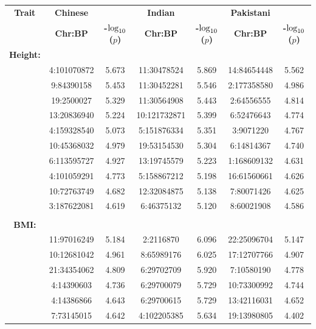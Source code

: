 \documentclass[12pt,a4paper]{article}
\def\log{{\rm log}}
\begin{document}
\clearpage
\setlength{\footskip}{1cm}
\addtocounter{table}{-1}

\begin{landscape}
\setlength{\footskip}{2cm}
\begin{table}[ht]
\centering
\begin{tabular}{ccccccc}
  \hline
  \textbf{Trait} & \textbf{Chinese} & & \textbf{Indian} & & \textbf{Pakistani} & \\ 
& \textbf{Chr:BP} & \textbf{-$\log_{10}$($p$)} & \textbf{Chr:BP} & \textbf{-$\log_{10}$($p$)} & \textbf{Chr:BP} & \textbf{-$\log_{10}$($p$)} \\ 
  \hline
\textbf{Height:} & & & & & & \\
& 4:101070872 & 5.673 & 11:30478524 & 5.869 & 14:84654448 & 5.562 \\ 
  & 9:84390158 & 5.453 & 11:30452281 & 5.546 & 2:177358580 & 4.986 \\ 
  & 19:2500027 & 5.329 & 11:30564908 & 5.443 & 2:64556555 & 4.814 \\ 
  & 13:20836940 & 5.224 & 10:121732871 & 5.399 & 6:52476643 & 4.774 \\ 
  & 4:159328540 & 5.073 & 5:151876334 & 5.351 & 3:9071220 & 4.767 \\ 
  & 10:45368032 & 4.979 & 19:53154530 & 5.304 & 6:14814367 & 4.740 \\ 
  & 6:113595727 & 4.927 & 13:19745579 & 5.223 & 1:168609132 & 4.631 \\ 
  & 4:101059291 & 4.773 & 5:158867212 & 5.198 & 16:61560661 & 4.626 \\ 
  & 10:72763749 & 4.682 & 12:32084875 & 5.138 & 7:80071426 & 4.625 \\ 
  & 3:187622081 & 4.619 & 6:46375132 & 5.120 & 8:60021908 & 4.586 \\ 
   \\
\textbf{BMI:} & & & & & & \\
& 11:97016249 & 5.184 & 2:2116870 & 6.096 & 22:25096704 & 5.147 \\ 
  & 10:12681042 & 4.961 & 8:65989176 & 6.025 & 17:12707766 & 4.907 \\ 
  & 21:34354062 & 4.809 & 6:29702709 & 5.920 & 7:10580190 & 4.778 \\ 
  & 4:14390603 & 4.736 & 6:29700079 & 5.729 & 10:73300992 & 4.744 \\ 
  & 4:14386866 & 4.643 & 6:29700615 & 5.729 & 13:42116031 & 4.652 \\ 
  & 7:73145015 & 4.642 & 4:102205385 & 5.634 & 19:13980805 & 4.402 \\ 

\end{tabular}
\end{table}
\end{landscape}
\end{document}
